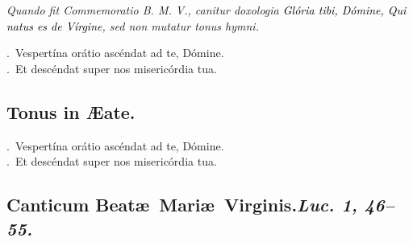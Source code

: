 \documentclass[12pt]{article} %
\newenvironment{rubric}{\vspace{2 mm}\color{benred8} \itshape \leftskip 0in \setlength{\parindent}{0.25in}}{\vspace{2 mm}}
\newenvironment{response}{\leftskip 0in \setlength{\parindent}{0in}}{\vspace{2 mm}}
\let\oldVbar\Vbar
\renewcommand{\Vbar}{\textcolor{benred8}{\oldVbar .}}
\let\oldRbar\Rbar
\renewcommand{\Rbar}{\textcolor{benred8}{\oldRbar .}}
\def\capitulumSpace{\hspace{20 mm}}
\begin{document}
\begin{rubric}
Quando fit Commemoratio B. M. V., canitur doxologia \emph{\textcolor{black}{Gl\'{o}ria tibi, D\'{o}mine, Qui natus es de V\'{i}rgine}}, sed non mutatur tonus hymni.

\end{rubric}

\begin{response}
\Vbar\ Vespert\'{i}na or\'{a}tio asc\'{e}ndat ad te, D\'{o}mine.\\
\Rbar\ Et desc\'{e}ndat super nos miseric\'{o}rdia tua.

\end{response}


\subsection*{}

\subsection*{Tonus in \AE {}ate.}


\gresetfirstlineaboveinitial{\small \textsc{ \textbf{\textcolor{benred8}{VIII}}}}{\small \textsc{ \textbf{\textcolor{benred8}{VIII}}}}

\begin{response}
\Vbar\ Vespert\'{i}na or\'{a}tio asc\'{e}ndat ad te, D\'{o}mine.\\
\Rbar\ Et desc\'{e}ndat super nos miseric\'{o}rdia tua.

\end{response}


\subsection*{}

\subsection*{Canticum Beat\ae\ Mari\ae\ Virginis.\capitulumSpace \emph{Luc. 1, 46--55.}}

\end{document}
